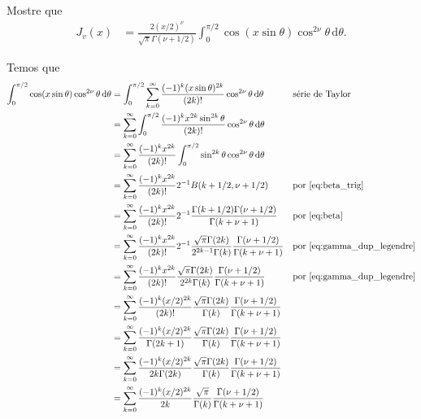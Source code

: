 \documentclass[a4paper,12pt, leqno, answers]{exam}
\begin{document}
\begin{questions}
    \question Mostre que
    \begin{align*}
        J_v(x) &= \frac{2(x/2)^\nu}{\sqrt{\pi} \Gamma(\nu + 1/2)} \int_0^{\pi/2} \cos(x \sin \theta) \cos^{2\nu} \theta \,\mathrm{d}\theta.
    \end{align*}
    \begin{solution}
        Temos que
        \begin{align*}
            \int_0^{\pi/2} \cos(x \sin \theta) \cos^{2 \nu} \theta \,\mathrm{d}\theta &= \int_0^{\pi/2} \sum_{k = 0}^\infty \frac{(-1)^k (x \sin \theta)^{2k}}{(2k)!} \cos^{2\nu} \theta \,\mathrm{d}\theta && \text{s\'{e}rie de Taylor} \\
            &= \sum_{k = 0}^\infty \int_0^{\pi/2} \frac{(-1)^k x^{2k} \sin^{2k} \theta}{(2k)!} \cos^{2\nu} \theta \,\mathrm{d}\theta \\
            &= \sum_{k = 0}^\infty \frac{(-1)^k x^{2k}}{(2k)!} \int_0^{\pi/2} \sin^{2k} \theta \cos^{2\nu} \theta \,\mathrm{d}\theta \\
            &= \sum_{k = 0}^\infty \frac{(-1)^k x^{2k}}{(2k)!} 2^{-1} B(k + 1/2, \nu + 1/2) && \text{por \eqref{eq:beta_trig}} \\
            &= \sum_{k = 0}^\infty \frac{(-1)^k x^{2k}}{(2k)!} 2^{-1} \frac{\Gamma(k + 1/2) \Gamma(\nu + 1/2)}{\Gamma(k + \nu + 1)} && \text{por \eqref{eq:beta}} \\
            &= \sum_{k = 0}^\infty \frac{(-1)^k x^{2k}}{(2k)!} 2^{-1} \frac{\sqrt{\pi} \Gamma(2k)}{2^{2k - 1} \Gamma(k)} \frac{\Gamma(\nu + 1/2)}{\Gamma(k + \nu + 1)} && \text{por \eqref{eq:gamma_dup_legendre}} \\
            &= \sum_{k = 0}^\infty \frac{(-1)^k x^{2k}}{(2k)!} \frac{\sqrt{\pi} \Gamma(2k)}{2^{2k} \Gamma(k)} \frac{\Gamma(\nu + 1/2)}{\Gamma(k + \nu + 1)} && \text{por \eqref{eq:gamma_dup_legendre}} \\
            &= \sum_{k = 0}^\infty \frac{(-1)^k (x/2)^{2k}}{(2k)!} \frac{\sqrt{\pi} \Gamma(2k)}{\Gamma(k)} \frac{\Gamma(\nu + 1/2)}{\Gamma(k + \nu + 1)} \\
            &= \sum_{k = 0}^\infty \frac{(-1)^k (x/2)^{2k}}{\Gamma(2k + 1)} \frac{\sqrt{\pi} \Gamma(2k)}{\Gamma(k)} \frac{\Gamma(\nu + 1/2)}{\Gamma(k + \nu + 1)} \\
            &= \sum_{k = 0}^\infty \frac{(-1)^k (x/2)^{2k}}{2k \Gamma(2k)} \frac{\sqrt{\pi} \Gamma(2k)}{\Gamma(k)} \frac{\Gamma(\nu + 1/2)}{\Gamma(k + \nu + 1)} \\
            &= \sum_{k = 0}^\infty \frac{(-1)^k (x/2)^{2k}}{2k} \frac{\sqrt{\pi}}{\Gamma(k)} \frac{\Gamma(\nu + 1/2)}{\Gamma(k + \nu + 1)} \\

\end{align*}
\end{solution}
\end{questions}
\end{document}
